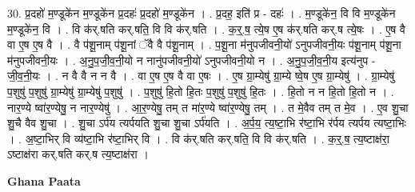\documentclass[17pt]{extarticle}
\begin{document}
30. प्र॒दहो॑ म॒ण्डूके॑न म॒ण्डूके॑न प्र॒दहः॑ प्र॒दहो॑ म॒ण्डूके॑न । . प्र॒दह॒ इति॑ प्र - दहः॑ । . म॒ण्डूके॑न॒ वि वि म॒ण्डूके॑न म॒ण्डूके॑न॒ वि । . वि क॑र्.षति कर्.षति॒ वि वि क॑र्.षति । . क॒र्॒.ष॒ त्ये॒ष ए॒ष क॑र्.षति कर्.ष त्ये॒षः । . ए॒ष वै वा ए॒ष ए॒ष वै । . वै प॑शू॒नाम् प॑शू॒नां ॅवै वै प॑शू॒नाम् । . प॒शू॒ना म॑नुपजीवनी॒यो॑ ऽनुपजीवनी॒यः प॑शू॒नाम् प॑शू॒ना म॑नुपजीवनी॒यः । . अ॒नु॒प॒जी॒व॒नी॒यो न नानु॑पजीवनी॒यो॑ ऽनुपजीवनी॒यो न । . अ॒नु॒प॒जी॒व॒नी॒य इत्य॑नुप - जी॒व॒नी॒यः । . न वै वै न न वै । . वा ए॒ष ए॒ष वै वा ए॒षः । . ए॒ष ग्रा॒म्येषु॑ ग्रा॒म्ये ष्वे॒ष ए॒ष ग्रा॒म्येषु॑ । . ग्रा॒म्येषु॑ प॒शुषु॑ प॒शुषु॑ ग्रा॒म्येषु॑ ग्रा॒म्येषु॑ प॒शुषु॑ । . प॒शुषु॑ हि॒तो हि॒तः प॒शुषु॑ प॒शुषु॑ हि॒तः । . हि॒तो न न हि॒तो हि॒तो न । . नार॒ण्ये ष्वा॑र॒ण्येषु॒ न नार॒ण्येषु॑ । . आ॒र॒ण्येषु॒ तम् त मा॑र॒ण्ये ष्वा॑र॒ण्येषु॒ तम् । . त मे॒वैव तम् त मे॒व । . ए॒व शु॒चा शु॒चै वैव शु॒चा । . शु॒चा ऽर्प॑य त्यर्पयति शु॒चा शु॒चा ऽर्प॑यति । . अ॒र्प॒य॒ त्य॒ष्टा॒भि र॑ष्टा॒भि र॑र्पय त्यर्पय त्यष्टा॒भिः । . अ॒ष्टा॒भिर् वि व्य॑ष्टा॒भि र॑ष्टा॒भिर् वि । . वि क॑र्.षति कर्.षति॒ वि वि क॑र्.षति । . क॒र्॒.ष॒ त्य॒ष्टाक्ष॑रा॒ ऽष्टाक्ष॑रा कर्.षति कर्.ष त्य॒ष्टाक्ष॑रा । \newline

\textbf{Ghana Paata } \newline
\end{document}
